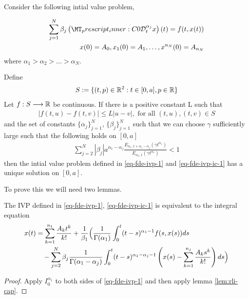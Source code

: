 \begin{mdframed}[innertopmargin=10pt]
\begin{theorem}[Uniqueness]
\label{thm-existence-uniq}
Consider the following intial value problem,

	\begin{align}
		\label{eq-fde-ivp-1}
		\sum_{j=1}^{N} \beta_j\capder{0}{t}{\alpha_j}{x}(t) = f(t,x(t)) \\
		\label{eq-fde-ivp-ic-1}
		x(0) = A_0, x_1(0) = A_1, \ldots, x^{n_N}(0) = A_{n_N}
	\end{align}
	where $ \alpha_1 > \alpha_2 > \ldots > \alpha_N $.
	
	Define
		\begin{align*}
		 S:= \{ (t,p) \in \mathbb{R}^2 : t \in [0, a], p \in \mathbb{R} \} 
		\end{align*}
	Let $ f : S \longrightarrow \mathbb{R} $ be continuous. If there is a positive constant L such that 
		\begin{align}
		\label{eq:uniq-lipshitz}
		|f(t,u) - f(t,v)| \leq L|u-v|, \text{ for all } (t,u), (t,v) \in S
		\end{align}
and the set of constants $ \{ \alpha_j \}_{j = 1}^{N} $, $ \{ \beta_j \}_{j=1}^N $
such that we can choose $ \gamma $ sufficiently large such that the following holds on $ [0, a] $
	\begin{align}
	    \label{eq:fde-uniq-cond}
\sum_{j=2}^N |\beta_j| a^{\alpha_1 - \alpha_j} \frac{E_{\alpha_1,1+\alpha_1-\alpha_j}(\gamma t^{\alpha_1})}{E_{\alpha_1,1}(\gamma t^{\alpha_1})} < 1
	\end{align}
	then the intial value problem defined in \ref{eq-fde-ivp-1} and \ref{eq-fde-ivp-ic-1} has a unique solution on $ [0, a] $.
\end{theorem}
\end{mdframed}
To prove this we will need two lemmas. 
\begin{mdframed}[innertopmargin=10pt]
\begin{lemma}
	The IVP defined in \eqref{eq-fde-ivp-1}, \eqref{eq-fde-ivp-ic-1} is equivalent to the integral equation
	\begin{align*}
		x(t) &= \sum_{k=1}^{n_1}\frac{A_kt^k}{k!} + \frac{1}{\beta_1} \Bigl( \frac{1}{\Gamma(\alpha_1)}\int_{0}^{t} (t-s)^{\alpha_1 - 1}f(s,x(s))ds \\
			& \ \ \ - \sum_{j=2}^{N}\beta_j \frac{1}{\Gamma(\alpha_1 - \alpha_j)}
			\int_{0}^{t}(t-s)^{\alpha_1 - \alpha_j - 1}\left(x(s) - \sum_{k=1}^{n_j}\frac{A_ks^k}{k!} \right) ds \Bigr)
	\end{align*}
\end{lemma}
\end{mdframed}
\begin{proof}
	Apply $ I_0^{\alpha_1} $ to both sides of \eqref{eq-fde-ivp-1} and then apply lemma \ref{lem:rli-cap}.
\end{proof}


